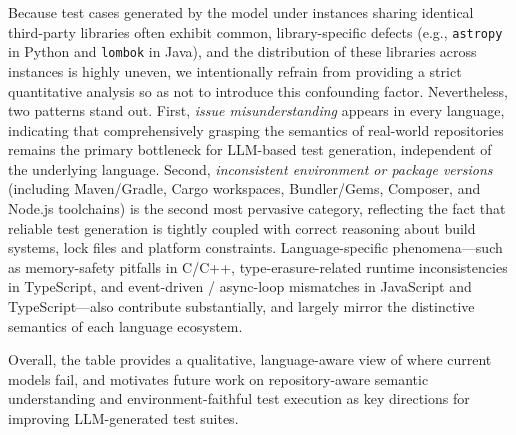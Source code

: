 \documentclass[11pt]{article}
\begin{document}
Because test cases generated by the model under instances sharing identical third-party libraries often exhibit common, library-specific defects (e.g., \texttt{astropy} in Python and \texttt{lombok} in Java), and the distribution of these libraries across instances is highly uneven, we intentionally refrain from providing a strict quantitative analysis so as not to introduce this confounding factor. Nevertheless, two patterns stand out. First, \emph{issue misunderstanding} appears in every language, indicating that comprehensively grasping the semantics of real-world repositories remains the primary bottleneck for LLM-based test generation, independent of the underlying language. Second, \emph{inconsistent environment or package versions} (including Maven/Gradle, Cargo workspaces, Bundler/Gems, Composer, and Node.js toolchains) is the second most pervasive category, reflecting the fact that reliable test generation is tightly coupled with correct reasoning about build systems, lock files and platform constraints. Language-specific phenomena—such as memory-safety pitfalls in C/C++, type-erasure-related runtime inconsistencies in TypeScript, and event-driven / async-loop mismatches in JavaScript and TypeScript—also contribute substantially, and largely mirror the distinctive semantics of each language ecosystem.

Overall, the table provides a qualitative, language-aware view of where current models fail, and motivates future work on repository-aware semantic understanding and environment-faithful test execution as key directions for improving LLM-generated test suites.
\end{document}
